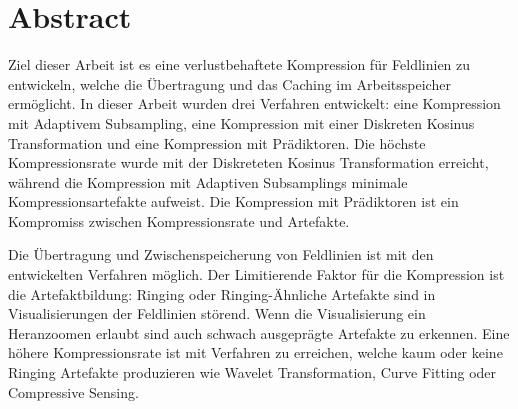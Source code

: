 \section*{Abstract}
Ziel dieser Arbeit ist es eine verlustbehaftete Kompression für Feldlinien zu entwickeln, welche die Übertragung und das Caching im Arbeitsspeicher ermöglicht. In dieser Arbeit wurden drei Verfahren entwickelt: eine Kompression mit Adaptivem Subsampling, eine Kompression mit einer Diskreten Kosinus Transformation und eine Kompression mit Prädiktoren. Die höchste Kompressionsrate wurde mit der Diskreteten Kosinus Transformation erreicht, während die Kompression mit Adaptiven Subsamplings minimale Kompressionsartefakte aufweist. Die Kompression mit Prädiktoren ist ein Kompromiss zwischen Kompressionsrate und Artefakte.

Die Übertragung und Zwischenspeicherung von Feldlinien ist mit den entwickelten Verfahren möglich. Der Limitierende Faktor für die Kompression ist die Artefaktbildung: Ringing oder Ringing-Ähnliche Artefakte sind in Visualisierungen der Feldlinien störend. Wenn die Visualisierung ein Heranzoomen erlaubt sind auch schwach ausgeprägte Artefakte zu erkennen. Eine höhere Kompressionsrate ist mit Verfahren zu erreichen, welche kaum oder keine Ringing Artefakte produzieren wie Wavelet Transformation, Curve Fitting oder Compressive Sensing.